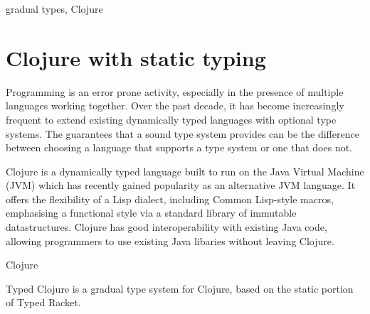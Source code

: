 \documentclass[preprint,10pt]{sigplanconf}
\begin{document}
\keywords
gradual types, Clojure

\section{Clojure with static typing}


Programming is an error prone activity, especially in the presence of
multiple languages working together. Over the past decade, it has become increasingly
frequent to extend existing dynamically typed languages with optional type systems.
The guarantees that a sound type system provides can be the difference between
choosing a language that supports a type system or one that does not.


Clojure is a dynamically typed language built to run on the Java Virtual Machine (JVM)
which has recently gained popularity as an alternative JVM language.
It offers the flexibility of a Lisp dialect, including Common Lisp-style macros,
emphasising a functional style via a standard library of immutable datastructures. 
Clojure has good interoperability with existing Java code, allowing programmers to
use existing Java libaries without leaving Clojure.


Clojure

Typed Clojure is a gradual type system for Clojure, based on the
static portion of Typed Racket.


\end{document}

